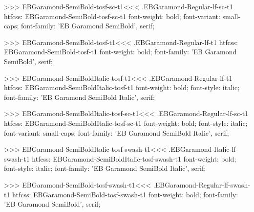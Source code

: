 {{{{{{{>>>
\<EBGaramond-SemiBold-tosf-sc-t1\><<<
.EBGaramond-Regular-lf-sc-t1
htfcss:  EBGaramond-SemiBold-tosf-sc-t1  font-weight: bold; font-variant: small-caps; font-family: 'EB Garamond SemiBold', serif;

>>>
\<EBGaramond-SemiBold-tosf-t1\><<<
.EBGaramond-Regular-lf-t1
htfcss:  EBGaramond-SemiBold-tosf-t1  font-weight: bold; font-family: 'EB Garamond SemiBold', serif;

>>>
\<EBGaramond-SemiBoldItalic-tosf-t1\><<<
.EBGaramond-Regular-lf-t1
htfcss:  EBGaramond-SemiBoldItalic-tosf-t1  font-weight: bold; font-style: italic; font-family: 'EB Garamond SemiBold Italic', serif;

>>>
\<EBGaramond-SemiBoldItalic-tosf-sc-t1\><<<
.EBGaramond-Regular-lf-sc-t1
htfcss:  EBGaramond-SemiBoldItalic-tosf-sc-t1  font-weight: bold; font-style: italic; font-variant: small-caps; font-family: 'EB Garamond SemiBold Italic', serif;

>>>
\<EBGaramond-SemiBoldItalic-tosf-swash-t1\><<<
.EBGaramond-Italic-lf-swash-t1
htfcss:  EBGaramond-SemiBoldItalic-tosf-swash-t1  font-weight: bold; font-style: italic; font-family: 'EB Garamond SemiBold Italic', serif;

>>>
\<EBGaramond-SemiBold-tosf-swash-t1\><<<
.EBGaramond-Regular-lf-swash-t1
htfcss:  EBGaramond-SemiBold-tosf-swash-t1  font-weight: bold; font-family: 'EB Garamond SemiBold', serif;

}}}}}}}
